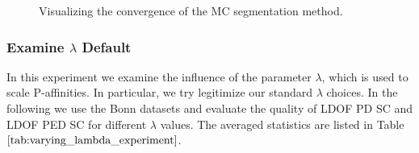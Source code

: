 \begin{figure}[H]
\begin{center}
\end{center}
\caption[Convergence Segmentations Two Chairs]{Visualizing the convergence of the MC segmentation method.}
\label{fig:two:chairs_segmentations_ped_mc_iters_exp}
\end{figure}

\subsubsection{Examine $\lambda$ Default}
In this experiment we examine the influence of the parameter $\lambda$, which is used to scale P-affinities. In particular, we try legitimize our standard $\lambda$ choices. In the following we use the Bonn datasets and evaluate the quality of LDOF PD SC and LDOF PED SC for different $\lambda$ values. The averaged statistics are listed in Table $\ref{tab:varying_lambda_experiment}$.
